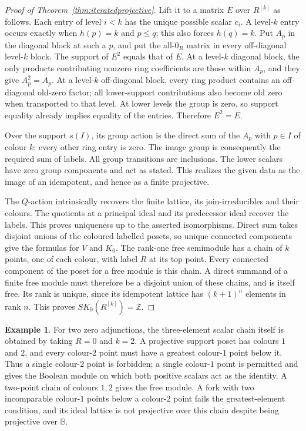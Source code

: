 \documentclass[11pt]{amsart}
\newcommand{\B}{\mathbb B}
\newcommand{\Z}{\mathbb Z}
\theoremstyle{definition}
\newtheorem{example}[theorem]{Example}
\theoremstyle{remark}
\begin{document}
\begin{proof}[Proof of Theorem~\ref{thm:iteratedprojective}]
Lift it to a matrix $E$ over $R^{[k]}$ as follows. Each entry of level $i<k$ has the unique possible scalar $c_i$. A level-$k$ entry occurs exactly when $h(p)=k$ and $p\le q$; this also forces $h(q)=k$. Put $A_p$ in the diagonal block at such a $p$, and put the all-$0_R$ matrix in every off-diagonal level-$k$ block. The support of $E^2$ equals that of $E$. At a level-$k$ diagonal block, the only products contributing nonzero ring coefficients are those within $A_p$, and they give $A_p^2=A_p$. At a level-$k$ off-diagonal block, every ring product contains an off-diagonal old-zero factor; all lower-support contributions also become old zero when transported to that level. At lower levels the group is zero, so support equality already implies equality of the entries. Therefore $E^2=E$.

Over the support $s(I)$, its group action is the direct sum of the $A_p$ with $p\in I$ of colour $k$: every other ring entry is zero. The image group is consequently the required sum of labels. All group transitions are inclusions. The lower scalars have zero group components and act as stated. This realizes the given data as the image of an idempotent, and hence as a finite projective.

The $Q$-action intrinsically recovers the finite lattice, its join-irreducibles and their colours. The quotients at a principal ideal and its predecessor ideal recover the labels. This proves uniqueness up to the asserted isomorphisms. Direct sum takes disjoint unions of the coloured labelled posets, so unique connected components give the formulas for $V$ and $K_0$. The rank-one free semimodule has a chain of $k$ points, one of each colour, with label $R$ at its top point. Every connected component of the poset for a free module is this chain. A direct summand of a finite free module must therefore be a disjoint union of these chains, and is itself free. Its rank is unique, since its idempotent lattice has $(k+1)^n$ elements in rank $n$. This proves $SK_0(R^{[k]})=\Z$.
\end{proof}

\begin{example}
For two zero adjunctions, the three-element scalar chain itself is obtained by taking $R=0$ and $k=2$. A projective support poset has colours $1$ and $2$, and every colour-$2$ point must have a greatest colour-$1$ point below it. Thus a single colour-$2$ point is forbidden; a single colour-$1$ point is permitted and gives the Boolean module on which both positive scalars act as the identity. A two-point chain of colours $1,2$ gives the free module. A fork with two incomparable colour-$1$ points below a colour-$2$ point fails the greatest-element condition, and its ideal lattice is not projective over this chain despite being projective over $\B$.
\end{example}
\end{document}
